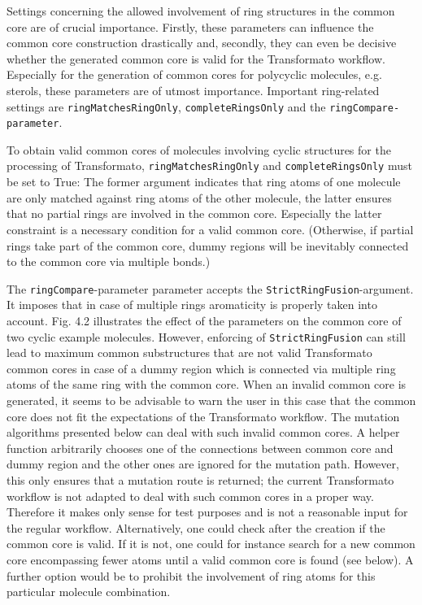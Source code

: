 Settings concerning the allowed involvement of ring structures in
the common core are of crucial importance. Firstly, these parameters
can influence the common core construction drastically and, secondly, they
can even be decisive whether the generated common core is valid for the
Transformato workflow.
Especially for the generation of common cores for polycyclic molecules, e.g. sterols, these parameters are of utmost importance.  
Important ring-related settings are \texttt{ringMatchesRingOnly}, \texttt{completeRingsOnly}
and the \texttt{ringCompare-parameter}. 

To obtain valid common cores of molecules involving cyclic structures for the processing of Transformato, \texttt{ringMatchesRingOnly}
and \texttt{completeRingsOnly} must be set to True: The former argument indicates
that ring atoms of one molecule are only matched against ring atoms
of the other molecule, the latter ensures that no partial rings are
involved in the common core. Especially the latter constraint is a
necessary condition for a valid common core. (Otherwise, if partial
rings take part of the common core, dummy regions will be inevitably
connected to the common core via multiple bonds.)

The \texttt{ringCompare}-parameter parameter accepts the \texttt{StrictRingFusion}-argument.
It imposes that in case of multiple rings aromaticity is properly
taken into account. Fig. 4.2 illustrates the effect of the parameters
on the common core of two cyclic example molecules. However, enforcing
of \texttt{StrictRingFusion} can still lead to maximum common substructures
that are not valid Transformato common cores in case of a dummy region
which is connected via multiple ring atoms of the same ring with the common
core. 
When an invalid common core is generated, it seems to be advisable to warn the user in this case that the common core does not fit the expectations of the Transformato workflow. 
The mutation algorithms presented below can deal with such invalid common cores. A helper function arbitrarily chooses one of the connections between common core and dummy region and the other ones are ignored for the mutation path. However, this only ensures that a mutation route is returned; the current Transformato workflow is not adapted to deal with such common cores in a proper way. Therefore it makes only sense for test purposes and is not a reasonable input for the regular workflow.
Alternatively, one could check after the creation if the common core is valid. If
it is not, one could for instance search for a new common core encompassing fewer
atoms until a valid common core is found (see below). A further option would be to prohibit the involvement of ring atoms for this particular molecule combination.

